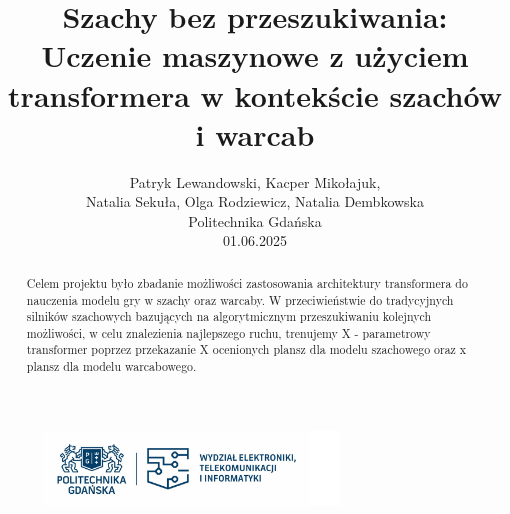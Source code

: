 \documentclass[12pt]{article}
\title{Szachy bez przeszukiwania: \\Uczenie maszynowe z użyciem transformera w kontekście szachów i warcab}
\author{Patryk Lewandowski, Kacper Mikołajuk, \\Natalia Sekuła, Olga Rodziewicz, Natalia Dembkowska \\ Politechnika Gdańska \\01.06.2025}
\date{}
\begin{document}
\maketitle

\begin{abstract}
Celem projektu było zbadanie możliwości zastosowania architektury transformera do nauczenia modelu gry w szachy oraz warcaby. W przeciwieństwie do tradycyjnych silników szachowych bazujących na algorytmicznym przeszukiwaniu kolejnych możliwości, w celu znalezienia najlepszego ruchu, trenujemy X - parametrowy transformer poprzez przekazanie X ocenionych plansz dla modelu szachowego oraz x plansz dla modelu warcabowego.
\end{abstract}

\begin{figure}[b]
  \centering
  \includegraphics[width=0.7\textwidth]{logotyp-PG-i-WETI.jpg}

\end{figure}

\clearpage
\tableofcontents
\clearpage
\end{document}

